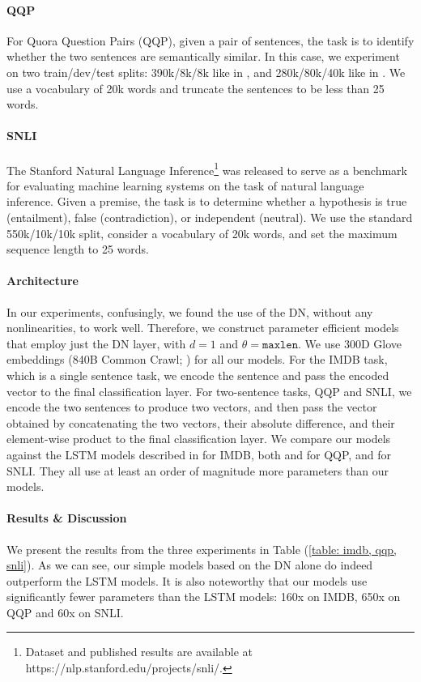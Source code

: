 \documentclass{article}
\begin{document}
\paragraph{QQP} For Quora Question Pairs (QQP), given a pair of sentences, the task is to identify whether the two sentences are semantically similar. In this case, we experiment on two train/dev/test splits: 390k/8k/8k like in \citet{shen2018baseline},  and 280k/80k/40k like in \citet{sharma2019natural}. We use a vocabulary of 20k words and truncate the sentences to be less than 25 words.

\paragraph{SNLI} The Stanford Natural Language Inference\footnote{ Dataset and published results are available at https://nlp.stanford.edu/projects/snli/.} was released to serve as a benchmark for evaluating machine learning systems on the task of natural language inference. Given a premise, the task is to determine whether a hypothesis is true (entailment), false (contradiction), or independent (neutral). We use the standard 550k/10k/10k split, consider a vocabulary of 20k words, and set the maximum sequence length to 25 words. 

\paragraph{Architecture} In our experiments, confusingly, we found the use of the DN, without any nonlinearities, to work well. Therefore, we construct parameter efficient models that employ just the DN layer, with $d = 1$ and $\theta = \texttt{maxlen}$. We use 300D Glove embeddings (840B Common Crawl; \citet{pennington2014glove}) for all our models. For the IMDB task, which is a single sentence task, we encode the sentence and pass the encoded vector to the final classification layer. For two-sentence tasks, QQP and SNLI, we encode the two sentences to produce two vectors, and then pass the vector obtained by concatenating the two vectors, their absolute difference, and their element-wise product to the final classification layer. We compare our models against the LSTM models described in \cite{gu2020hippo} for IMDB, both \cite{shen2018baseline} and \cite{sharma2019natural} for QQP, and \cite{bowman2015large} for SNLI. They all use at least an order of magnitude more parameters than our models.

\paragraph{Results \& Discussion} We present the results from the three experiments in Table (\ref{table: imdb, qqp, snli}). As we can see, our simple models based on the DN alone do indeed outperform the LSTM models. It is also noteworthy that our models use significantly fewer parameters than the LSTM models: 160x on IMDB, 650x on QQP and 60x on SNLI. 
\end{document}
